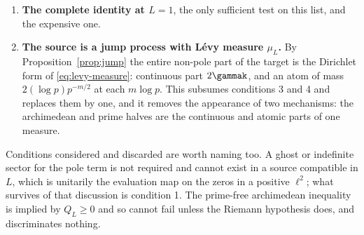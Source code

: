 \begin{enumerate}
$1-\min\operatorname{spec}(Q_L;K_+)$ is below $10^{-9}$ at $L=1$ and below
$10^{-24}$ at $L=3$. Any hypothesis supplying a margin uniform in $L$ ---
a self-map into a fixed compact subset of a cone's interior, a uniform
contraction ratio, a spectral gap --- proves something false.
\item\textbf{The complete identity at $L=1$}, the only sufficient test on this
list, and the expensive one.
\item\textbf{The source is a jump process with L\'evy measure $\mu_L$.} By
Proposition~\ref{prop:jump} the entire non-pole part of the target is the
Dirichlet form of \eqref{eq:levy-measure}: continuous part $2\gammak$, and an
atom of mass $2(\log p)p^{-m/2}$ at each $m\log p$. This subsumes conditions 3
and 4 and replaces them by one, and it removes the appearance of two mechanisms:
the archimedean and prime halves are the continuous and atomic parts of one
measure.
\end{enumerate}

Conditions considered and discarded are worth naming too. A ghost or indefinite
sector for the pole term is not required and cannot exist in a source compatible
in $L$, which is unitarily the evaluation map on the zeros in a positive
$\ell^2$; what survives of that discussion is condition 1. The prime-free
archimedean inequality is implied by $Q_L\geq0$ and so cannot fail unless the
Riemann hypothesis does, and discriminates nothing.
